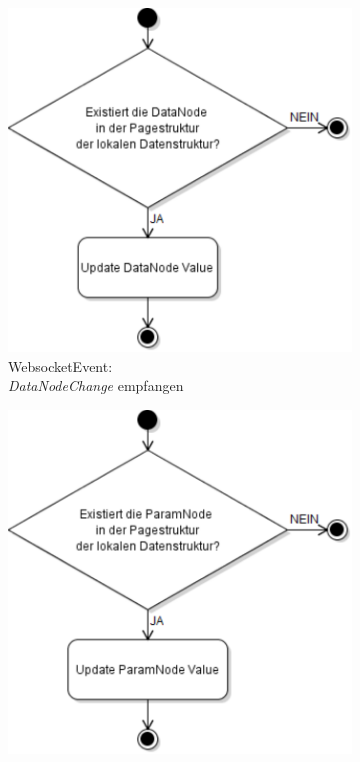 \begin{figure}[ht]
  \centering
  \begin{subfigure}[b]{0.48\textwidth}
    \centering
    \includegraphics[width=\textwidth]{content/hauptteil/systemEntwurf/res/wsHandler/frontend/wsEvent_dataNodeChange.pdf}
    \caption{WebsocketEvent:\\\emph{DataNodeChange} empfangen}
    \label{fig:aDDF:wsEvent_dataNodeChange}
  \end{subfigure}
  \hfill
  \begin{subfigure}[b]{0.48\textwidth}
      \centering
      \includegraphics[width=\textwidth]{content/hauptteil/systemEntwurf/res/wsHandler/frontend/wsEvent_paramNodeChange.pdf}

\end{subfigure}
\end{figure}
